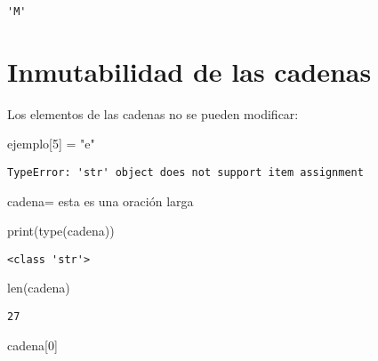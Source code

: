 \documentclass[
  letterpaper,
  DIV=11,
  numbers=noendperiod]{scrreprt}
\newenvironment{Shaded}{\begin{snugshade}}{\end{snugshade}}
\newcommand{\BuiltInTok}[1]{\textcolor[rgb]{0.00,0.23,0.31}{#1}}
\newcommand{\DecValTok}[1]{\textcolor[rgb]{0.68,0.00,0.00}{#1}}
\newcommand{\NormalTok}[1]{\textcolor[rgb]{0.00,0.23,0.31}{#1}}
\newcommand{\OperatorTok}[1]{\textcolor[rgb]{0.37,0.37,0.37}{#1}}
\newcommand{\StringTok}[1]{\textcolor[rgb]{0.13,0.47,0.30}{#1}}
\begin{document}
\begin{verbatim}
'M'
\end{verbatim}

\section{Inmutabilidad de las
cadenas}\label{inmutabilidad-de-las-cadenas}

Los elementos de las cadenas no se pueden modificar:

\begin{Shaded}
\begin{Highlighting}[]
\NormalTok{ejemplo[}\DecValTok{5}\NormalTok{] }\OperatorTok{=} \StringTok{"e"}
\end{Highlighting}
\end{Shaded}

\begin{verbatim}
TypeError: 'str' object does not support item assignment
\end{verbatim}

\begin{Shaded}
\begin{Highlighting}[]
\NormalTok{cadena}\OperatorTok{=}\StringTok{\textquotesingle{}\textquotesingle{}\textquotesingle{}}
\StringTok{esta es una}
\StringTok{oración}
\StringTok{larga}
\StringTok{\textquotesingle{}\textquotesingle{}\textquotesingle{}}
\end{Highlighting}
\end{Shaded}

\begin{Shaded}
\begin{Highlighting}[]
\BuiltInTok{print}\NormalTok{(}\BuiltInTok{type}\NormalTok{(cadena))}
\end{Highlighting}
\end{Shaded}

\begin{verbatim}
<class 'str'>
\end{verbatim}

\begin{Shaded}
\begin{Highlighting}[]
\BuiltInTok{len}\NormalTok{(cadena)}
\end{Highlighting}
\end{Shaded}

\begin{verbatim}
27
\end{verbatim}

\begin{Shaded}
\begin{Highlighting}[]
\NormalTok{cadena[}\DecValTok{0}\NormalTok{]}
\end{Highlighting}
\end{Shaded}
\end{document}
